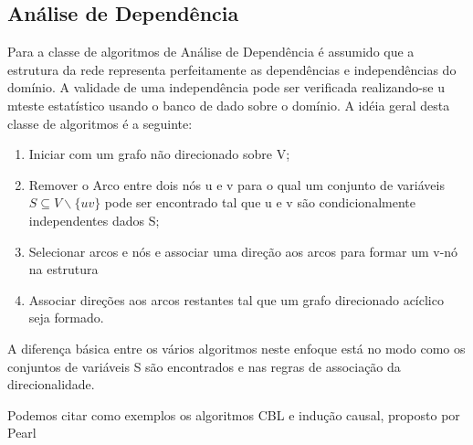 \subsection{Análise de Dependência}
Para a classe de algoritmos de Análise de Dependência é assumido que a estrutura da rede representa perfeitamente as dependências e independências do domínio. A validade de uma independência pode ser verificada realizando-se u mteste estatístico usando o banco de dado sobre o domínio. A idéia geral desta classe de algoritmos é a seguinte:

\begin{enumerate}
	\item Iniciar com um grafo não direcionado sobre V;
	\item Remover o Arco entre dois nós u e v para o qual um conjunto de variáveis $S \subseteq V\backslash \{uv\} $ pode ser encontrado tal que u e v são condicionalmente independentes dados S;
	\item Selecionar arcos e nós e associar uma direção aos arcos para formar um v-nó na estrutura
	\item Associar direções aos arcos restantes tal que um grafo direcionado acíclico seja formado.
\end{enumerate}
A diferença básica entre os vários algoritmos neste enfoque está no modo como os conjuntos de variáveis S são encontrados e nas regras de associação da direcionalidade.

Podemos citar como exemplos os algoritmos CBL \cite{cbl98} e indução causal, proposto por Pearl \cite{pearl91}



